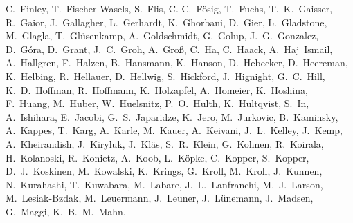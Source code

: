 \documentclass[manuscript]{aastex}
\begin{document}
{C.~Finley,
T.~Fischer-Wasels,
S.~Flis,
C.-C.~F\"osig,
T.~Fuchs,
T.~K.~Gaisser,
R.~Gaior,
J.~Gallagher,
L.~Gerhardt,
K.~Ghorbani,
D.~Gier,
L.~Gladstone,
M.~Glagla,
T.~Gl\"usenkamp,
A.~Goldschmidt,
G.~Golup,
J.~G.~Gonzalez,
D.~G\'ora,
D.~Grant,
J.~C.~Groh,
A.~Gro{\ss},
C.~Ha,
C.~Haack,
A.~Haj~Ismail,
A.~Hallgren,
F.~Halzen,
B.~Hansmann,
K.~Hanson,
D.~Hebecker,
D.~Heereman,
K.~Helbing,
R.~Hellauer,
D.~Hellwig,
S.~Hickford,
J.~Hignight,
G.~C.~Hill,
K.~D.~Hoffman,
R.~Hoffmann,
K.~Holzapfel,
A.~Homeier,
K.~Hoshina,
F.~Huang,
M.~Huber,
W.~Huelsnitz,
P.~O.~Hulth,
K.~Hultqvist,
S.~In,
A.~Ishihara,
E.~Jacobi,
G.~S.~Japaridze,
K.~Jero,
M.~Jurkovic,
B.~Kaminsky,
A.~Kappes,
T.~Karg,
A.~Karle,
M.~Kauer,
A.~Keivani,
J.~L.~Kelley,
J.~Kemp,
A.~Kheirandish,
J.~Kiryluk,
J.~Kl\"as,
S.~R.~Klein,
G.~Kohnen,
R.~Koirala,
H.~Kolanoski,
R.~Konietz,
A.~Koob,
L.~K\"opke,
C.~Kopper,
S.~Kopper,
D.~J.~Koskinen,
M.~Kowalski,
K.~Krings,
G.~Kroll,
M.~Kroll,
J.~Kunnen,
N.~Kurahashi,
T.~Kuwabara,
M.~Labare,
J.~L.~Lanfranchi,
M.~J.~Larson,
M.~Lesiak-Bzdak,
M.~Leuermann,
J.~Leuner,
J.~L\"unemann,
J.~Madsen,
G.~Maggi,
K.~B.~M.~Mahn,
}
\end{document}
